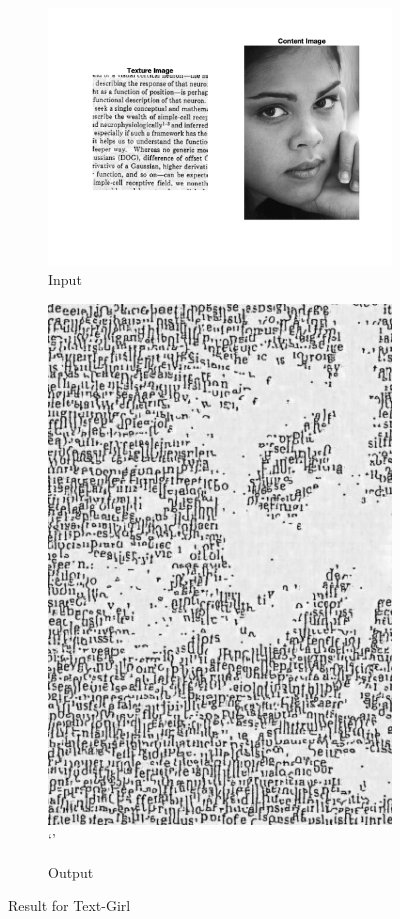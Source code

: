 \documentclass[10pt,twocolumn,letterpaper]{article}
\begin{document}
\begin{figure}[h]
    \centering
    \begin{subfigure}[h]{0.45\textwidth}
        \centering
        \includegraphics[trim={2cm 4cm 2cm 1cm}, clip, scale=0.5]{../results/bsize/inp_text_girl.png}
        \caption{Input}
    \end{subfigure}
    \hfill
    \begin{subfigure}[h]{0.5\textwidth}
       \centering
       \includegraphics[scale=0.4]{../results/bsize/out_text_girl_B_10_bdr_0_700000.png}`'
       \caption{Output}
   \end{subfigure}
   \caption{Result for Text-Girl}
   \label{fig:ap_bs}
\end{figure}
\end{document}

